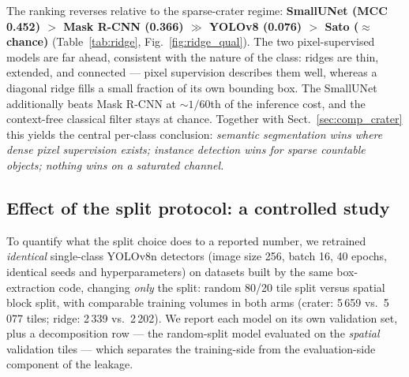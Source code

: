 The ranking reverses relative to the sparse-crater regime: \textbf{SmallUNet (MCC 0.452) $>$ Mask R-CNN (0.366) $\gg$ YOLOv8 (0.076) $>$ Sato ($\approx$ chance)} (Table~\ref{tab:ridge}, Fig.~\ref{fig:ridge_qual}). The two pixel-supervised models are far ahead, consistent with the nature of the class: ridges are thin, extended, and connected --- pixel supervision describes them well, whereas a diagonal ridge fills a small fraction of its own bounding box. The SmallUNet additionally beats Mask R-CNN at ${\sim}1/60$th of the inference cost, and the context-free classical filter stays at chance. Together with Sect.~\ref{sec:comp_crater} this yields the central per-class conclusion: \emph{semantic segmentation wins where dense pixel supervision exists; instance detection wins for sparse countable objects; nothing wins on a saturated channel.}

\subsection{Effect of the split protocol: a controlled study}
\label{sec:split_study}

To quantify what the split choice does to a reported number, we retrained \emph{identical} single-class YOLOv8n detectors (image size 256, batch 16, 40 epochs, identical seeds and hyperparameters) on datasets built by the same box-extraction code, changing \emph{only} the split: random 80/20 tile split versus spatial block split, with comparable training volumes in both arms (crater: 5\,659 vs.\ 5\,077 tiles; ridge: 2\,339 vs.\ 2\,202). We report each model on its own validation set, plus a decomposition row --- the random-split model evaluated on the \emph{spatial} validation tiles --- which separates the training-side from the evaluation-side component of the leakage.

\begin{table}[htbp]
\centering
\caption{Split-protocol study: identical YOLOv8n detectors, identical budget (40 epochs), different train/validation split. ``Random $\to$ spatial'' evaluates the random-split model on the spatial validation tiles.}
\label{tab:split_study}
\end{table}

